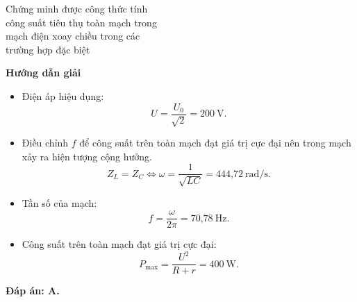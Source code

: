 \begin{dang}{Chứng minh được công thức tính\\ công suất tiêu thụ toàn mạch trong \\mạch điện xoay chiều trong các\\ trường hợp đặc biệt}
{		
	}
	{\begin{center}
			\textbf{Hướng dẫn giải}
		\end{center}
		
		
		\begin{itemize}
			\item Điện áp hiệu dụng:
			\begin{equation*}
				U=\dfrac{U_0}{\sqrt 2}=200\ \text{V}.
			\end{equation*}
			\item Điều chỉnh $f$ để công suất trên toàn mạch đạt giá trị cực đại nên trong mạch xảy ra hiện tượng cộng hưởng.
			\begin{equation*}
				Z_L=Z_C \Leftrightarrow \omega =\dfrac{1}{\sqrt {LC}} = \text{444,72}\ \text{rad/s}.
			\end{equation*}
			\item Tần số của mạch:
			\begin{equation*}
				f=\dfrac{\omega}{2\pi}=\text{70,78}\ \text{Hz}.
			\end{equation*}
			\item Công suất trên toàn mạch đạt giá trị cực đại:
			\begin{equation*}
				P_{\text{max}}=\dfrac{U^2}{R+r} =400\ \text{W}.
			\end{equation*}
		\end{itemize}
		
		
		\textbf{Đáp án: A.}
	}
	
\end{dang}
